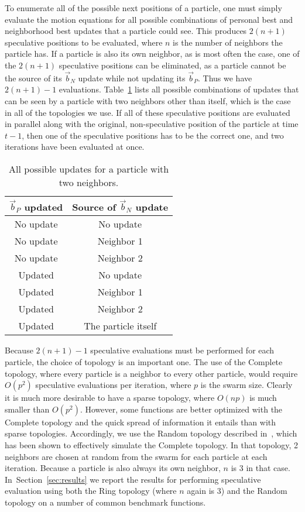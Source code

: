 \documentclass[letterpaper]{sig-alt-release2}
\renewcommand{\sec}[1]{Section~\ref{sec:#1}}
\providecommand{\nbest}{\ensuremath{\Vec{b}_N}}
\providecommand{\pbest}{\ensuremath{\Vec{b}_P}}
\begin{document}
To enumerate all of the possible next positions of a particle, one must simply
evaluate the motion equations for all possible combinations of personal best
and neighborhood best updates that a particle could see.  This produces
$2(n+1)$ speculative positions to be evaluated, where $n$ is the number of
neighbors the particle has.  If a particle is also its own neighbor, as is most
often the case, one of the $2(n+1)$ speculative positions can be eliminated, as
a particle cannot be the source of its $\nbest$ update while not updating its
$\pbest$.  Thus we have $2(n+1)-1$ evaluations.  Table~\ref{tab:evals} lists
all possible combinations of updates that can be seen by a particle with two
neighbors other than itself, which is the case in all of the topologies we use.
If all of these speculative positions are evaluated in parallel along with the
original, non-speculative position of the particle at time $t-1$, then one of
the speculative positions has to be the correct one, and two iterations have
been evaluated at once.

\begin{table}
  \caption{All possible updates for a particle with two neighbors.}
  \label{tab:evals}
  \centering
  \begin{tabular}{cc}
	$\pbest$ updated&Source of $\nbest$ update\\
	\hline
	\hline
	No update&No update\\
	\hline
	No update&Neighbor 1\\
	\hline
	No update&Neighbor 2\\
	\hline
	Updated&No update\\
	\hline
	Updated&Neighbor 1\\
	\hline
	Updated&Neighbor 2\\
	\hline
	Updated&The particle itself\\
	\hline
  \end{tabular}
\end{table}

Because $2(n+1)-1$ speculative evaluations must be performed for each particle,
the choice of topology is an important one.  The use of the Complete topology,
where every particle is a neighbor to every other particle, would require
$O(p^2)$ speculative evaluations per iteration, where $p$ is the swarm size.
Clearly it is much more desirable to have a sparse topology, where $O(np)$ is
much smaller than $O(p^2)$.  However, some functions are better optimized with
the Complete topology and the quick spread of information it entails than with
sparse topologies.  Accordingly, we use the Random topology described
in~\cite{mcnabb-cec09}, which has been shown to effectively simulate the
Complete topology.  In that topology, 2 neighbors are chosen at random from the
swarm for each particle at each iteration.  Because a particle is also always
its own neighbor, $n$ is $3$ in that case.  In~\sec{results} we report the
results for performing speculative evaluation using both the Ring topology
(where $n$ again is $3$) and the Random topology on a number of common
benchmark functions.
\end{document}
